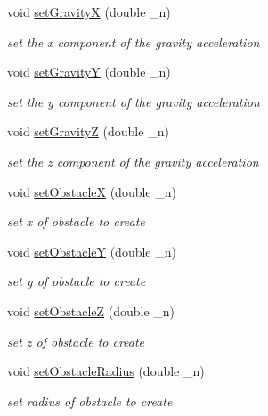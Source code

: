 \begin{DoxyCompactItemize}
void \hyperlink{classGLWindow_ace93ca1230eb0655bad846e3c45b4130}{setGravityX} (double \_\-n)
\begin{DoxyCompactList}\small\item\em set the x component of the gravity acceleration \item\end{DoxyCompactList}\item 
void \hyperlink{classGLWindow_ac6d036c5dee3fcd44ca2ad3f762d96b8}{setGravityY} (double \_\-n)
\begin{DoxyCompactList}\small\item\em set the y component of the gravity acceleration \item\end{DoxyCompactList}\item 
void \hyperlink{classGLWindow_accef41ba5c67d1504a8f7496337a610c}{setGravityZ} (double \_\-n)
\begin{DoxyCompactList}\small\item\em set the z component of the gravity acceleration \item\end{DoxyCompactList}\item 
void \hyperlink{classGLWindow_aaa93b03d03d1dc482730780645b7871c}{setObstacleX} (double \_\-n)
\begin{DoxyCompactList}\small\item\em set x of obstacle to create \item\end{DoxyCompactList}\item 
void \hyperlink{classGLWindow_a9e54638fd294268ac1de1bb975fd273d}{setObstacleY} (double \_\-n)
\begin{DoxyCompactList}\small\item\em set y of obstacle to create \item\end{DoxyCompactList}\item 
void \hyperlink{classGLWindow_a6e1ada1afcabc2dc69ba0df2dad81652}{setObstacleZ} (double \_\-n)
\begin{DoxyCompactList}\small\item\em set z of obstacle to create \item\end{DoxyCompactList}\item 
void \hyperlink{classGLWindow_aedb07f97bd356b5153e299709e69d625}{setObstacleRadius} (double \_\-n)
\begin{DoxyCompactList}\small\item\em set radius of obstacle to create \item\end{DoxyCompactList}\item 

\end{DoxyCompactItemize}
